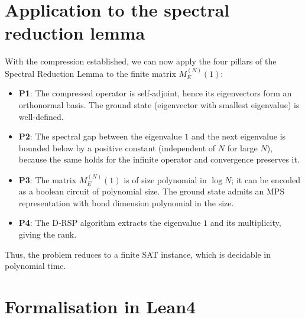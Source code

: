 \documentclass[11pt,a4paper]{article}
\begin{document}
\section{Application to the spectral reduction lemma}

With the compression established, we can now apply the four pillars of the Spectral Reduction Lemma to the finite matrix \(M_E^{(N)}(1)\):

\begin{itemize}
\item \textbf{P1}: The compressed operator is self‑adjoint, hence its eigenvectors form an orthonormal basis. The ground state (eigenvector with smallest eigenvalue) is well‑defined.
\item \textbf{P2}: The spectral gap between the eigenvalue \(1\) and the next eigenvalue is bounded below by a positive constant (independent of \(N\) for large \(N\)), because the same holds for the infinite operator and convergence preserves it.
\item \textbf{P3}: The matrix \(M_E^{(N)}(1)\) is of size polynomial in \(\log N\); it can be encoded as a boolean circuit of polynomial size. The ground state admits an MPS representation with bond dimension polynomial in the size.
\item \textbf{P4}: The D‑RSP algorithm extracts the eigenvalue \(1\) and its multiplicity, giving the rank.
\end{itemize}

Thus, the problem reduces to a finite SAT instance, which is decidable in polynomial time.

\section{Formalisation in Lean4}
\end{document}
